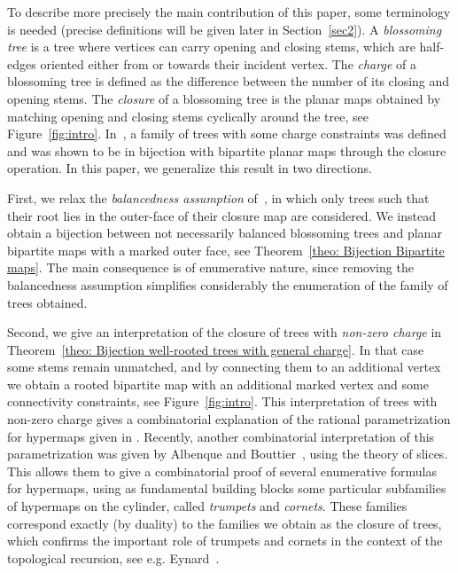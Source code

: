 \documentclass[11pt,reqno,tbtags]{amsart}
\numberwithin{equation}{section}
\numberwithin{theo}{section}
\theoremstyle{definition}
\begin{document}
To describe more precisely the main contribution of this paper, some terminology is needed (precise definitions will be given later in Section~\ref{sec2}). A \emph{blossoming tree} is a tree where vertices can carry opening and closing stems, which are half-edges oriented either from or towards their incident vertex. The \emph{charge} of a blossoming tree is defined as the difference between the number of  its closing and opening stems. The \emph{closure} of a blossoming tree is the planar maps obtained by matching opening and closing stems cyclically around the tree, see Figure~\ref{fig:intro}. In~\cite{BousquetMelouSchaeffer_Bipartite}, a family of trees with some charge constraints was defined and was shown to be in bijection with bipartite planar maps through the closure operation. In this paper, we generalize this result in two directions.

First, we relax the \emph{balancedness assumption} of~\cite{BousquetMelouSchaeffer_Bipartite}, in which only trees such that their root lies in the outer-face of their closure map are considered. We instead obtain a bijection between not necessarily balanced blossoming trees and planar bipartite maps with a marked outer face, see Theorem~\ref{theo: Bijection Bipartite maps}. The main consequence is of enumerative nature, since removing the balancedness assumption simplifies considerably the enumeration of the family of trees obtained.  

Second, we give an interpretation of the closure of trees with \emph{non-zero charge} in Theorem~\ref{theo: Bijection well-rooted trees with general charge}. In that case some stems remain unmatched, and by connecting them to an additional vertex we obtain a rooted bipartite map with an additional marked vertex and some connectivity constraints, see Figure~\ref{fig:intro}. This interpretation of trees with non-zero charge gives a combinatorial explanation of the rational parametrization for hypermaps given in \cite[Chapter 8]{Eynard16}. Recently, another combinatorial interpretation of this parametrization was given by Albenque and Bouttier~\cite{AlbenqueBouttier_slices}, using the theory of slices. This allows them to give a combinatorial proof of several enumerative formulas for hypermaps, using as fundamental building blocks some particular subfamilies of hypermaps on the cylinder, called \emph{trumpets} and \emph{cornets}. These families correspond exactly (by duality) to the families we obtain as the closure of trees, which confirms the important role of trumpets and cornets in the context of the topological recursion, see e.g. Eynard~\cite{Eynard16}.
\end{document}
